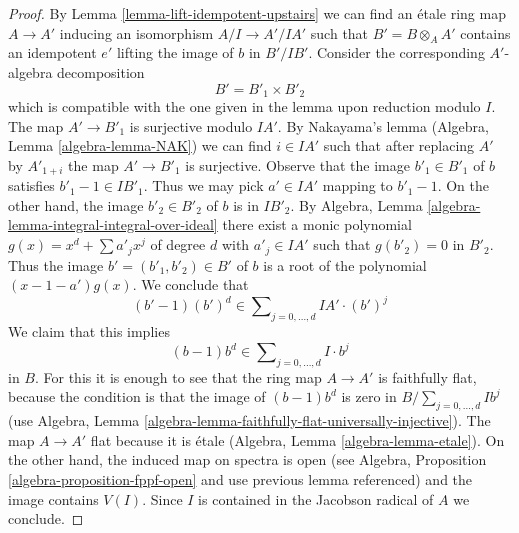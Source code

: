 \documentclass[10pt,a4paper]{amsart}
\theoremstyle{plain}
\theoremstyle{definition}
\theoremstyle{remark}
\numberwithin{equation}{subsection}
\begin{document}
\begin{proof}
By Lemma \ref{lemma-lift-idempotent-upstairs} we can find an
\'etale ring map $A \to A'$ inducing an isomorphism $A/I \to A'/IA'$
such that $B' = B \otimes_A A'$ contains
an idempotent $e'$ lifting the image of $b$ in $B'/IB'$.
Consider the corresponding $A'$-algebra decomposition
$$
B' = B'_1 \times B'_2
$$
which is compatible with the one given in the lemma upon
reduction modulo $I$.
The map $A' \to B'_1$ is surjective modulo $IA'$. By Nakayama's lemma
(Algebra, Lemma \ref{algebra-lemma-NAK})
we can find $i \in IA'$ such that after replacing $A'$
by $A'_{1 + i}$ the map $A' \to B'_1$ is surjective.
Observe that the image $b'_1 \in B'_1$ of $b$ 
satisfies $b'_1 - 1 \in IB'_1$.
Thus we may pick $a' \in IA'$ mapping to $b'_1 - 1$.
On the other hand, the image $b'_2 \in B'_2$ of $b$ is in $IB'_2$. By
Algebra, Lemma \ref{algebra-lemma-integral-integral-over-ideal}
there exist a monic polynomial
$g(x) = x^d + \sum a'_j x^j$ of degree $d$ with $a'_j \in IA'$ such that
$g(b'_2) = 0$ in $B'_2$. Thus the image $b' = (b'_1, b'_2) \in B'$
of $b$ is a root of the polynomial $(x - 1 - a')g(x)$. We conclude that
$$
(b' - 1)(b')^d \in \sum\nolimits_{j = 0, \ldots, d} IA' \cdot (b')^j
$$
We claim that this implies
$$
(b - 1)b^d \in \sum\nolimits_{j = 0, \ldots, d} I \cdot b^j
$$
in $B$. For this it is enough to see that the ring map
$A \to A'$ is faithfully flat, because the condition is that
the image of $(b - 1)b^d$ is zero in $B/\sum_{j = 0, \ldots, d} Ib^j$
(use Algebra, Lemma \ref{algebra-lemma-faithfully-flat-universally-injective}).
The map $A \to A'$ flat because it is \'etale
(Algebra, Lemma \ref{algebra-lemma-etale}).
On the other hand, the induced map on spectra is open
(see Algebra, Proposition \ref{algebra-proposition-fppf-open} and use
previous lemma referenced) and the image
contains $V(I)$. Since $I$ is contained in the Jacobson radical of $A$
we conclude.
\end{proof}
\end{document}
